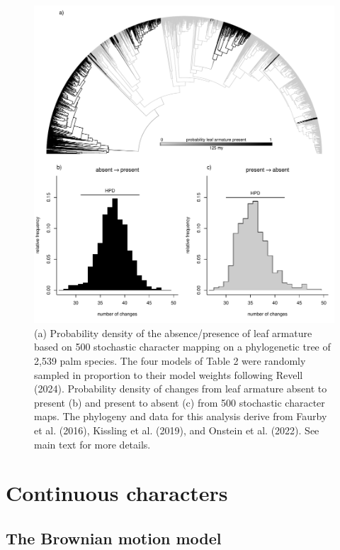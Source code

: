 \documentclass{article}
\begin{document}
\begin{figure}
\includegraphics[width=1\linewidth]{Revell.AncestralReconstruction_files/figure-latex/fig8-1} \caption{(a) Probability density of the absence/presence of leaf armature based on 500 stochastic character mapping on a phylogenetic tree of 2,539 palm species. The four models of Table 2 were randomly sampled in proportion to their model weights following Revell (2024). Probability density of changes from leaf armature absent to present (b) and present to absent (c) from 500 stochastic character maps. The phylogeny and data for this analysis derive from Faurby et al. (2016), Kissling et al. (2019), and Onstein et al. (2022). See main text for more details.}\label{fig:fig8}
\end{figure}

\section{Continuous characters}\label{continuous-characters}

\subsection{The Brownian motion model}\label{the-brownian-motion-model}
\end{document}
